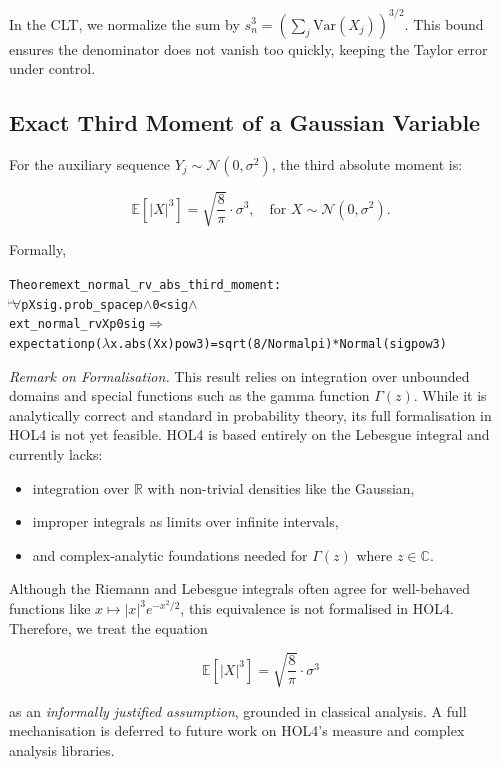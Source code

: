 In the CLT, we normalize the sum by $s_n^3 = \left( \sum_j \mathrm{Var}(X_j) \right)^{3/2}$. This bound ensures the denominator does not vanish too quickly, keeping the Taylor error under control.

\subsection{Exact Third Moment of a Gaussian Variable}

For the auxiliary sequence $Y_j \sim \mathcal{N}(0, \sigma^2)$, the third absolute moment is:

\[
\mathbb{E}[|X|^3] = \sqrt{\frac{8}{\pi}} \cdot \sigma^3,
\quad \text{for } X \sim \mathcal{N}(0, \sigma^2).
\]

Formally,
\begin{hol}
  \begin{alltt}
    Theorem ext\_normal\_rv\_abs\_third\_moment :
    \(\!\!\!{\turn}\!\!\!\!\) \(\forall\)p X sig. prob\_space p \(\land\) 0 < sig \(\land\)
    ext\_normal\_rv X p 0 sig \(\Rightarrow\)
    expectation p (\(\lambda\)x. abs (X x) pow 3) = sqrt (8 / Normal pi) * Normal (sig pow 3)
  \end{alltt}
\end{hol}

\noindent
\emph{Remark on Formalisation.}
This result relies on integration over unbounded domains and special functions such as the gamma function $\Gamma(z)$. While it is analytically correct and standard in probability theory, its full formalisation in HOL4 is not yet feasible. HOL4 is based entirely on the Lebesgue integral and currently lacks:

\begin{itemize}
    \item integration over $\mathbb{R}$ with non-trivial densities like the Gaussian,
    \item improper integrals as limits over infinite intervals,
    \item and complex-analytic foundations needed for $\Gamma(z)$ where $z \in \mathbb{C}$.
\end{itemize}

Although the Riemann and Lebesgue integrals often agree for well-behaved functions like $x \mapsto |x|^3 e^{-x^2/2}$, this equivalence is not formalised in HOL4. Therefore, we treat the equation

\[
\mathbb{E}[|X|^3] = \sqrt{\frac{8}{\pi}} \cdot \sigma^3
\]

as an \emph{informally justified assumption}, grounded in classical analysis. A full mechanisation is deferred to future work on HOL4’s measure and complex analysis libraries.

